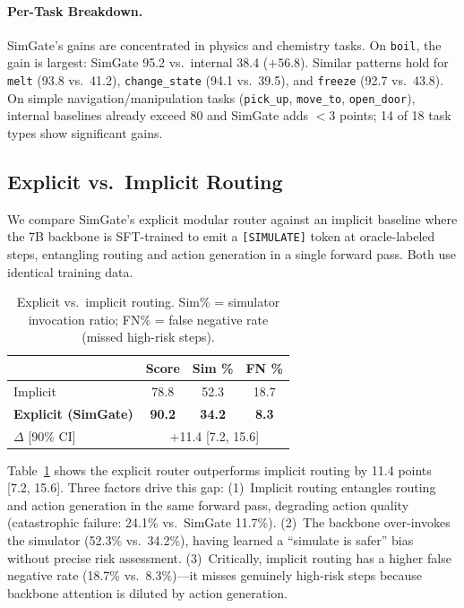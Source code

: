 \documentclass[11pt,a4paper]{article}
\begin{document}
\paragraph{Per-Task Breakdown.}
SimGate's gains are concentrated in physics and chemistry tasks.
On \texttt{boil}, the gain is largest: SimGate 95.2 vs.\ internal 38.4 ($+56.8$).
Similar patterns hold for \texttt{melt} (93.8 vs.\ 41.2), \texttt{change\_state} (94.1 vs.\ 39.5), and \texttt{freeze} (92.7 vs.\ 43.8).
On simple navigation/manipulation tasks (\texttt{pick\_up}, \texttt{move\_to}, \texttt{open\_door}), internal baselines already exceed 80 and SimGate adds $<3$ points; 14 of 18 task types show significant gains.

\subsection{Explicit vs.\ Implicit Routing}

We compare SimGate's explicit modular router against an implicit baseline where the 7B backbone is SFT-trained to emit a \texttt{[SIMULATE]} token at oracle-labeled steps, entangling routing and action generation in a single forward pass.
Both use identical training data.

\begin{table}[t]
\centering
\small
\begin{tabular}{lccc}
\toprule
& \textbf{Score} & \textbf{Sim \%} & \textbf{FN \%} \\
\midrule
Implicit & 78.8 & 52.3 & 18.7 \\
\textbf{Explicit (SimGate)} & \textbf{90.2} & \textbf{34.2} & \textbf{8.3} \\
\midrule
$\Delta$ [90\% CI] & \multicolumn{3}{c}{+11.4 [7.2, 15.6]} \\
\bottomrule
\end{tabular}
\caption{Explicit vs.\ implicit routing. Sim\% = simulator invocation ratio; FN\% = false negative rate (missed high-risk steps).}
\label{tab:explicit_implicit}
\end{table}

Table~\ref{tab:explicit_implicit} shows the explicit router outperforms implicit routing by 11.4 points [7.2, 15.6].
Three factors drive this gap:
(1)~Implicit routing entangles routing and action generation in the same forward pass, degrading action quality (catastrophic failure: 24.1\% vs.\ SimGate 11.7\%).
(2)~The backbone over-invokes the simulator (52.3\% vs.\ 34.2\%), having learned a ``simulate is safer'' bias without precise risk assessment.
(3)~Critically, implicit routing has a higher false negative rate (18.7\% vs.\ 8.3\%)---it misses genuinely high-risk steps because backbone attention is diluted by action generation.
\end{document}
